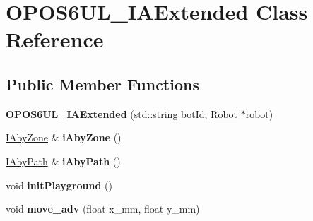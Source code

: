\hypertarget{classOPOS6UL__IAExtended}{}\section{O\+P\+O\+S6\+U\+L\+\_\+\+I\+A\+Extended Class Reference}
\label{classOPOS6UL__IAExtended}
\subsection*{Public Member Functions}
\begin{DoxyCompactItemize}
\item 
\mbox{\label{classOPOS6UL__IAExtended_a25b80fe3ad16f9481def0b7f939a5a3d}} 
{\bfseries O\+P\+O\+S6\+U\+L\+\_\+\+I\+A\+Extended} (std\+::string bot\+Id, \hyperlink{classRobot}{Robot} $\ast$robot)
\item 
\mbox{\label{classOPOS6UL__IAExtended_a4ebf8bb8f21224f42f7f2192958ca535}} 
\hyperlink{classIAbyZone}{I\+Aby\+Zone} \& {\bfseries i\+Aby\+Zone} ()
\item 
\mbox{\label{classOPOS6UL__IAExtended_aa902e0684bee670e1ad189948e7d7971}} 
\hyperlink{classIAbyPath}{I\+Aby\+Path} \& {\bfseries i\+Aby\+Path} ()
\item 
\mbox{\label{classOPOS6UL__IAExtended_aeaa64a0f2c66aa082fc79e6fa77472ab}} 
void {\bfseries init\+Playground} ()
\item 
\mbox{\label{classOPOS6UL__IAExtended_af172b51de46364b5a1d6b6f6354888e3}} 
void {\bfseries move\+\_\+adv} (float x\+\_\+mm, float y\+\_\+mm)
\end{DoxyCompactItemize}
